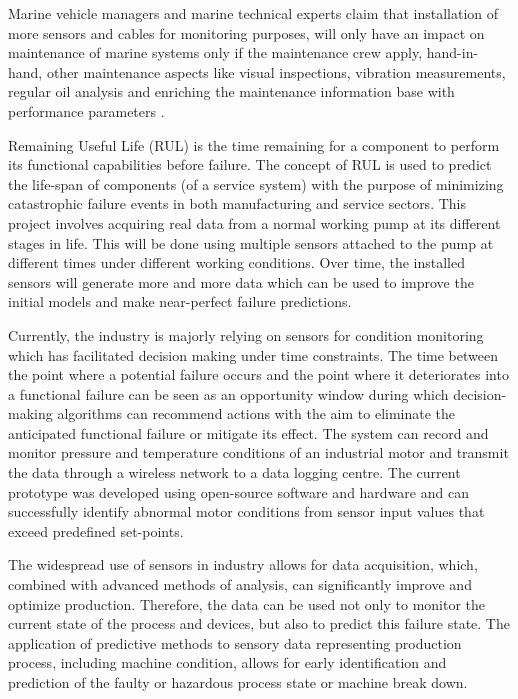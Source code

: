 Marine vehicle managers and marine technical experts claim that installation of more sensors and cables for monitoring purposes, will only have an impact on maintenance of marine systems only if the maintenance crew apply, hand-in-hand, other maintenance aspects like visual inspections, vibration measurements, regular oil analysis and enriching the maintenance information base with performance parameters \cite{kimera_predictive_2020}. 

Remaining Useful Life (RUL) is the time remaining for a component to perform its functional capabilities before failure. The concept of RUL is used to predict the life-span of components (of a service system) with the purpose of minimizing catastrophic failure events in both manufacturing and service sectors. This project involves acquiring real data from a normal working pump at its different stages in life. This will be done using multiple sensors attached to the pump at different times under different working conditions. Over time, the installed sensors will generate more and more data which can be used to improve the initial models and make near-perfect failure predictions. 

Currently, the industry is majorly relying on sensors for condition monitoring which has facilitated decision making under time constraints. The time between the point where a potential failure occurs and the point where it deteriorates into a functional failure can be seen as an opportunity window during which decision-making algorithms can recommend actions with the aim to eliminate the anticipated functional failure or mitigate its effect. The system can record and monitor pressure and temperature conditions of an industrial motor and transmit the data through a wireless network to a data logging centre. The current prototype was developed using open-source software and hardware and can successfully identify abnormal motor conditions from sensor input values that exceed predefined set-points. 

The widespread use of sensors in industry allows for data acquisition, which, combined with advanced methods of analysis, can significantly improve and optimize production. Therefore, the data can be used not only to monitor the current state of the process and devices, but also to predict this failure state. The application of predictive methods to sensory data representing production process, including machine condition, allows for early identification and prediction of the faulty or hazardous process state or machine break down\cite{tinga_predictive_2017}.

